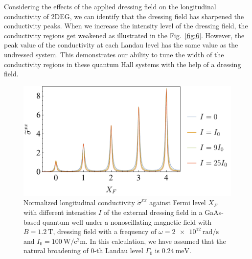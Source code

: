 \documentclass[
 reprint,
 amsmath,amssymb,
 aps,
 prb,
]{revtex4-2}
\begin{document}
{\color{Red}Considering the effects of the applied dressing field on the longitudinal conductivity of 2DEG, we can identify that the dressing field has sharpened the conductivity peaks.}
When we increase the intensity level of the dressing field, the conductivity regions get weakened as illustrated in the Fig.~\ref{fig:6}.
However, the peak value of the conductivity at each Landau level has the same value as the undressed system. This demonstrates our ability to tune the width of the conductivity regions in these quantum Hall systems with the help of a dressing field.

\begin{figure}[t]
\includegraphics[scale=0.54]{fig_4_conductivity_with_fermi_level}
\caption{ Normalized longitudinal conductivity $\widetilde{\sigma}^{xx}$ against Fermi level $X_F$ with different intensities $I$ of the external dressing field in a GaAs-based quantum well under a nonoscillating magnetic field with $B = \SI{1.2}{\tesla}$, dressing field with a  frequency of $\omega =\SI{2e12}{\radian\per\second}$ and $I_0 =\SI{100}{\watt\per\square\centi\metre}$. In this calculation, we have assumed that the natural  broadening of $0$-th Landau level $\Gamma_0$ is $\SI{0.24}{\milli\eV}$.}
\label{fig:5}
\end{figure}
\end{document}
